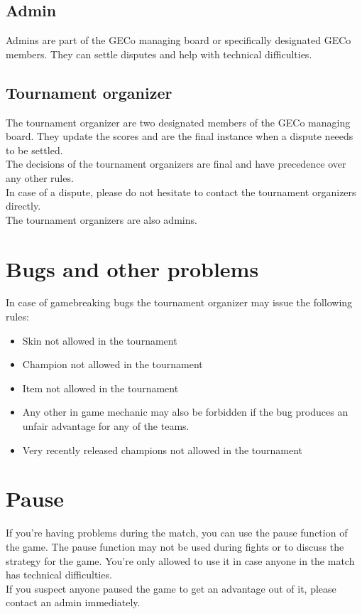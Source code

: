 \documentclass{article}
\begin{document}
\subsection{Admin}
Admins are part of the GECo managing board or specifically designated GECo members. They can settle disputes and help with technical difficulties.

\subsection{Tournament organizer}
The tournament organizer are two designated members of the GECo managing board. They update the scores and are the final instance when a dispute neeeds to be settled.
\\
The decisions of the tournament organizers are final and have precedence over any other rules.
\\
In case of a dispute, please do not hesitate to contact the tournament organizers directly.
\\
The tournament organizers are also admins.

\section{Bugs and other problems}
In case of gamebreaking bugs the tournament organizer may issue the following rules:
\begin{itemize}
	\item Skin not allowed in the tournament
	\item Champion not allowed in the tournament
	\item Item not allowed in the tournament
	\item Any other in game mechanic may also be forbidden if the bug produces an unfair advantage for any of the teams.
	\item Very recently released champions not allowed in the tournament
\end{itemize}

\section{Pause}
If you're having problems during the match, you can use the pause function of the game. The pause function may not be used during fights or to discuss the strategy for the game. You're only allowed to use it in case anyone in the match has technical difficulties.
\\
If you suspect anyone paused the game to get an advantage out of it, please contact an admin immediately.
\end{document}
